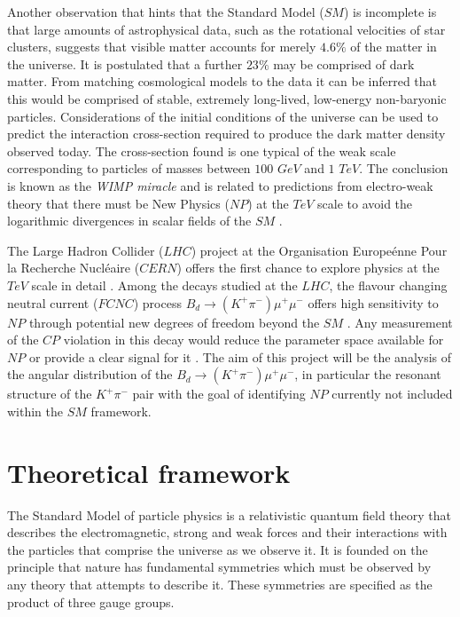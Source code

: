 \documentclass[a4paper,12pt]{article}
\begin{document}
Another observation that hints that the Standard Model ($SM$) is incomplete is that large amounts of astrophysical data, such as the rotational velocities of star clusters, suggests that visible matter accounts for merely $4.6\%$ of the matter in the universe. It is postulated that a further $23\%$ may be comprised of dark matter. From matching cosmological models to the data it can be inferred that this would be comprised of stable, extremely long-lived, low-energy non-baryonic particles. Considerations of the initial conditions of the universe can be used to predict the interaction cross-section required to produce the dark matter density observed today. The cross-section found is one typical of the weak scale corresponding to particles of masses between $100$ $ GeV$ and $1$ $ TeV$. The conclusion is known as the {\it WIMP miracle} and is related to predictions from electro-weak theory that there must be New Physics ($NP$) at the $TeV$ scale to avoid the logarithmic divergences in scalar fields of the $SM$ \cite[p. 12]{paper1}. 

The Large Hadron Collider ($LHC$) project \cite{paper10} at the Organisation Europe\'enne Pour la Recherche Nucl\'eaire ($CERN$) offers the first chance to explore physics at the $TeV$ scale in detail  \cite[p. 12]{paper1}. Among the decays studied at the $LHC$, the flavour changing neutral current ($FCNC$) process $B_d\rightarrow (K^+\pi^{-})\mu^+\mu^-$ offers high sensitivity to $NP$ through potential new degrees of freedom beyond the $SM$ \cite{paper39}. Any measurement of the $CP$ violation in this decay would reduce the parameter space available for $NP$ or provide a clear signal for it \cite[p. 74]{paper1}. The aim of this project will be the analysis of the angular distribution of the $B_d\rightarrow (K^+\pi^{-})\mu^+\mu^-$, in particular the resonant structure of the $K^+\pi^-$ pair with the goal of identifying $NP$ currently not included within the $SM$ framework.  

\section{Theoretical framework}

The Standard Model of particle physics  \cite{paper22,paper23,paper24,paper25,paper26,paper27,paper28,paper29,paper30} is a relativistic quantum field theory that describes the electromagnetic, strong and weak forces and their interactions with the particles that comprise the universe as we observe it. It is founded on the principle that nature has fundamental symmetries which must be observed by any theory that attempts to describe it. 
These symmetries are specified as the product of three gauge groups. 
\end{document}
